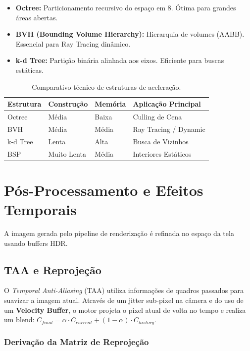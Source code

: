 \begin{itemize}
    \item \textbf{Octree:} Particionamento recursivo do espaço em 8. Ótima para grandes áreas abertas.
    \item \textbf{BVH (Bounding Volume Hierarchy):} Hierarquia de volumes (AABB). Essencial para Ray Tracing dinâmico.
    \item \textbf{k-d Tree:} Partição binária alinhada aos eixos. Eficiente para buscas estáticas.
\end{itemize}

\begin{table}[h]
\centering
\begin{tabular}{|l|l|l|l|}
\hline
\textbf{Estrutura} & \textbf{Construção} & \textbf{Memória} & \textbf{Aplicação Principal} \\ \hline
Octree & Média & Baixa & Culling de Cena \\ \hline
BVH & Média & Média & Ray Tracing / Dynamic \\ \hline
k-d Tree & Lenta & Alta & Busca de Vizinhos \\ \hline
BSP & Muito Lenta & Média & Interiores Estáticos \\ \hline
\end{tabular}
\caption{Comparativo técnico de estruturas de aceleração.}
\end{table}

\section{Pós-Processamento e Efeitos Temporais}

A imagem gerada pelo pipeline de renderização é refinada no espaço da tela usando buffers HDR.

\subsection{TAA e Reprojeção}

O \textit{Temporal Anti-Aliasing} (TAA) utiliza informações de quadros passados para suavizar a imagem atual. Através de um jitter sub-pixel na câmera e do uso de um \textbf{Velocity Buffer}, o motor projeta o pixel atual de volta no tempo e realiza um blend: $C_{final} = \alpha \cdot C_{current} + (1-\alpha) \cdot C_{history}$. 

\subsubsection{Derivação da Matriz de Reprojeção}

